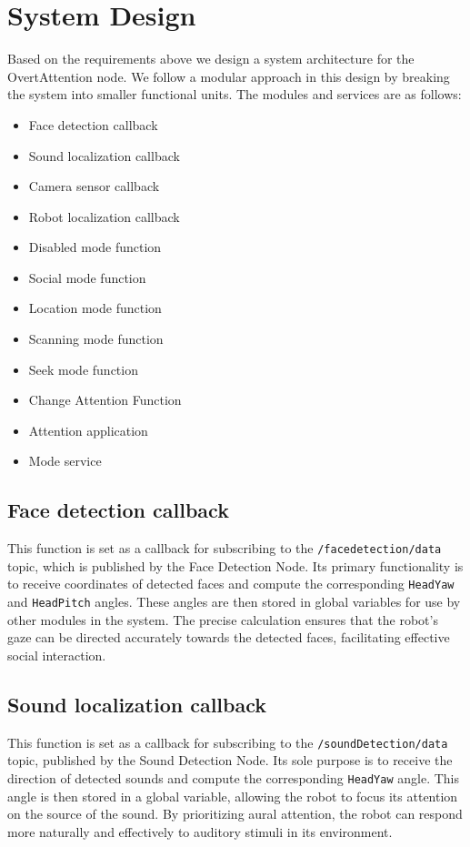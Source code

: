 \documentclass{CSSRforAfrica}
\begin{document}
\section{System Design}
Based on the requirements above we design a system architecture for the OvertAttention node. We follow a modular approach in this design by breaking the system into smaller functional units. The modules and services are as follows:
\begin{itemize}
	\item Face detection callback
	\item Sound localization callback
	\item Camera sensor callback
	\item Robot localization callback
	\item Disabled mode function
	\item Social mode function
	\item Location mode function
	\item Scanning mode function
	\item Seek mode function
	\item Change Attention Function
	\item Attention application
	\item Mode service
\end{itemize}

\subsection{Face detection callback}

This function is set as a callback for subscribing to the \texttt{/facedetection/data} topic, which is published by the Face Detection Node. Its primary functionality is to receive coordinates of detected faces and compute the corresponding \texttt{HeadYaw} and \texttt{HeadPitch} angles. These angles are then stored in global variables for use by other modules in the system. The precise calculation ensures that the robot's gaze can be directed accurately towards the detected faces, facilitating effective social interaction.

\subsection{Sound localization callback}

This function is set as a callback for subscribing to the \texttt{/soundDetection/data} topic, published by the Sound Detection Node. Its sole purpose is to receive the direction of detected sounds and compute the corresponding \texttt{HeadYaw} angle. This angle is then stored in a global variable, allowing the robot to focus its attention on the source of the sound. By prioritizing aural attention, the robot can respond more naturally and effectively to auditory stimuli in its environment.
\end{document}
